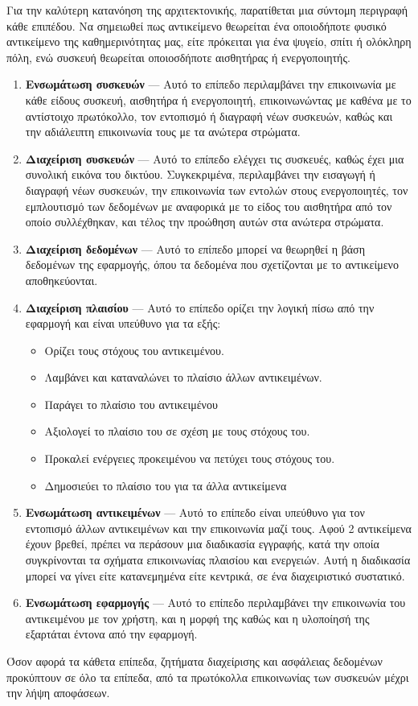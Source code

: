 Για την καλύτερη κατανόηση της αρχιτεκτονικής, παρατίθεται μια σύντομη περιγραφή κάθε επιπέδου. Να σημειωθεί πως αντικείμενο θεωρείται ένα οποιοδήποτε φυσικό αντικείμενο της καθημερινότητας μας, είτε πρόκειται για ένα ψυγείο, σπίτι ή ολόκληρη πόλη, ενώ συσκευή θεωρείται οποιοσδήποτε αισθητήρας ή ενεργοποιητής.
\begin{enumerate}
    \item \textbf{Ενσωμάτωση συσκευών} --- Αυτό το επίπεδο περιλαμβάνει την επικοινωνία με κάθε είδους συσκευή, αισθητήρα ή ενεργοποιητή, επικοινωνώντας με καθένα με το αντίστοιχο πρωτόκολλο, τον εντοπισμό ή διαγραφή νέων συσκευών, καθώς και την αδιάλειπτη επικοινωνία τους με τα ανώτερα στρώματα.
    \item \textbf{Διαχείριση συσκευών} --- Αυτό το επίπεδο ελέγχει τις συσκευές, καθώς έχει μια συνολική εικόνα του δικτύου. Συγκεκριμένα, περιλαμβάνει την εισαγωγή ή διαγραφή νέων συσκευών, την επικοινωνία των εντολών στους ενεργοποιητές, τον εμπλουτισμό των δεδομένων με  αναφορικά με το είδος του αισθητήρα από τον οποίο συλλέχθηκαν, και τέλος την προώθηση αυτών στα ανώτερα στρώματα.
    \item \textbf{Διαχείριση δεδομένων} --- Αυτό το επίπεδο μπορεί να θεωρηθεί η βάση δεδομένων της εφαρμογής, όπου τα δεδομένα που σχετίζονται με το αντικείμενο αποθηκεύονται.
    \item \textbf{Διαχείριση πλαισίου} --- Αυτό το επίπεδο ορίζει την λογική πίσω από την εφαρμογή και είναι υπεύθυνο για τα εξής:
        \begin{itemize}
            \item Ορίζει τους στόχους του αντικειμένου.
            \item Λαμβάνει και καταναλώνει το πλαίσιο άλλων αντικειμένων.
            \item Παράγει το πλαίσιο του αντικειμένου
            \item Αξιολογεί το πλαίσιο του σε σχέση με τους στόχους του.
            \item Προκαλεί ενέργειες προκειμένου να πετύχει τους στόχους του.
            \item Δημοσιεύει το πλαίσιο του για τα άλλα αντικείμενα
        \end{itemize}
    \item \textbf{Ενσωμάτωση αντικειμένων} --- Αυτό το επίπεδο είναι υπεύθυνο για τον εντοπισμό άλλων αντικειμένων και την επικοινωνία μαζί τους. Αφού 2 αντικείμενα έχουν βρεθεί, πρέπει να περάσουν μια διαδικασία εγγραφής, κατά την οποία συγκρίνονται τα σχήματα επικοινωνίας πλαισίου και ενεργειών. Αυτή η διαδικασία μπορεί να γίνει είτε κατανεμημένα είτε κεντρικά, σε ένα διαχειριστικό συστατικό. 
    \item \textbf{Ενσωμάτωση εφαρμογής} --- Αυτό το επίπεδο περιλαμβάνει την επικοινωνία του αντικειμένου με τον χρήστη, και η μορφή της καθώς και η υλοποίησή της εξαρτάται έντονα από την εφαρμογή.
\end{enumerate}
Όσον αφορά τα κάθετα επίπεδα, ζητήματα διαχείρισης και ασφάλειας δεδομένων προκύπτουν σε όλο τα επίπεδα, από τα πρωτόκολλα επικοινωνίας των συσκευών μέχρι την λήψη αποφάσεων.

